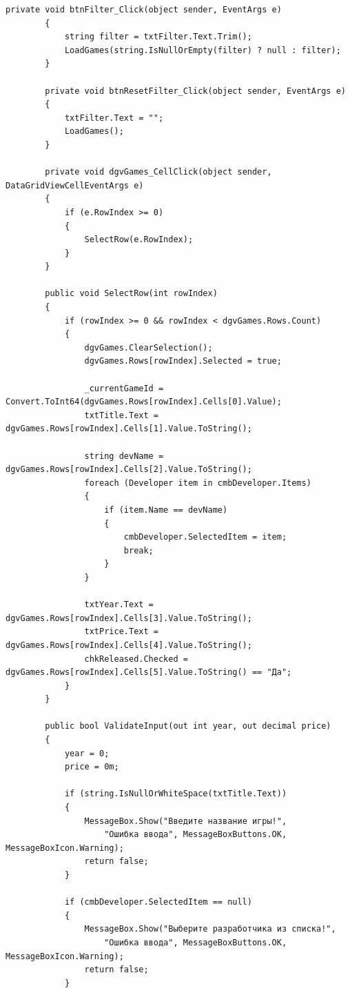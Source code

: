\documentclass[oneside,a4paper,14pt]{extarticle}
\begin{document}
\begin{lstlisting}[language={[Sharp]C}]
        private void btnFilter_Click(object sender, EventArgs e)
        {
            string filter = txtFilter.Text.Trim();
            LoadGames(string.IsNullOrEmpty(filter) ? null : filter);
        }

        private void btnResetFilter_Click(object sender, EventArgs e)
        {
            txtFilter.Text = "";
            LoadGames();
        }

        private void dgvGames_CellClick(object sender, DataGridViewCellEventArgs e)
        {
            if (e.RowIndex >= 0)
            {
                SelectRow(e.RowIndex);
            }
        }

        public void SelectRow(int rowIndex)
        {
            if (rowIndex >= 0 && rowIndex < dgvGames.Rows.Count)
            {
                dgvGames.ClearSelection();
                dgvGames.Rows[rowIndex].Selected = true;

                _currentGameId = Convert.ToInt64(dgvGames.Rows[rowIndex].Cells[0].Value);
                txtTitle.Text = dgvGames.Rows[rowIndex].Cells[1].Value.ToString();

                string devName = dgvGames.Rows[rowIndex].Cells[2].Value.ToString();
                foreach (Developer item in cmbDeveloper.Items)
                {
                    if (item.Name == devName)
                    {
                        cmbDeveloper.SelectedItem = item;
                        break;
                    }
                }

                txtYear.Text = dgvGames.Rows[rowIndex].Cells[3].Value.ToString();
                txtPrice.Text = dgvGames.Rows[rowIndex].Cells[4].Value.ToString();
                chkReleased.Checked = dgvGames.Rows[rowIndex].Cells[5].Value.ToString() == "Да";
            }
        }

        public bool ValidateInput(out int year, out decimal price)
        {
            year = 0;
            price = 0m;

            if (string.IsNullOrWhiteSpace(txtTitle.Text))
            {
                MessageBox.Show("Введите название игры!",
                    "Ошибка ввода", MessageBoxButtons.OK, MessageBoxIcon.Warning);
                return false;
            }

            if (cmbDeveloper.SelectedItem == null)
            {
                MessageBox.Show("Выберите разработчика из списка!",
                    "Ошибка ввода", MessageBoxButtons.OK, MessageBoxIcon.Warning);
                return false;
            }


\end{lstlisting}
\end{document}
